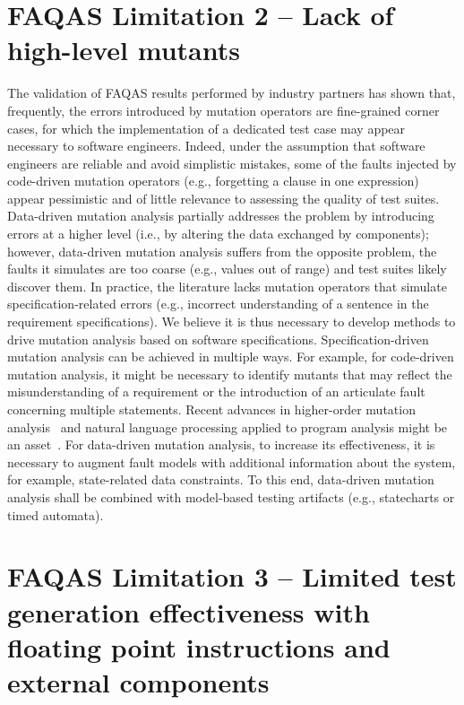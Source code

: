 \section*{FAQAS Limitation 2 – Lack of high-level mutants}

The validation of FAQAS results performed by industry partners has shown that, frequently, the errors introduced by mutation operators are fine-grained corner cases, for which the implementation of a dedicated test case may appear necessary to software engineers. Indeed, under the assumption that software engineers are reliable and avoid simplistic mistakes, some of the faults injected by code-driven mutation operators (e.g., forgetting a clause in one expression) appear pessimistic and of little relevance to assessing the quality of test suites. Data-driven mutation analysis partially addresses the problem by introducing errors at a higher level (i.e., by altering the data exchanged by components); however, data-driven mutation analysis suffers from the opposite problem, the faults it simulates are too coarse (e.g., values out of range) and test suites likely discover them. In practice, the literature lacks mutation operators that simulate specification-related errors (e.g., incorrect understanding of a sentence in the requirement specifications). We believe it is thus necessary to develop methods to drive mutation analysis based on software specifications. Specification-driven mutation analysis can be achieved in multiple ways. For example, for code-driven mutation analysis, it might be necessary to identify mutants that may reflect the misunderstanding of a requirement or the introduction of an articulate fault concerning multiple statements. Recent advances in higher-order mutation analysis~\cite{Wong:Higher} and natural language processing applied to program analysis might be an asset~\cite{Mai:NLP}. For data-driven mutation analysis, to increase its effectiveness, it is necessary to augment fault models with additional information about the system, for example, state-related data constraints. To this end, data-driven mutation analysis shall be combined with model-based testing artifacts (e.g., statecharts or timed automata).

\section*{FAQAS Limitation 3 – Limited test generation effectiveness with floating point instructions and external components}

